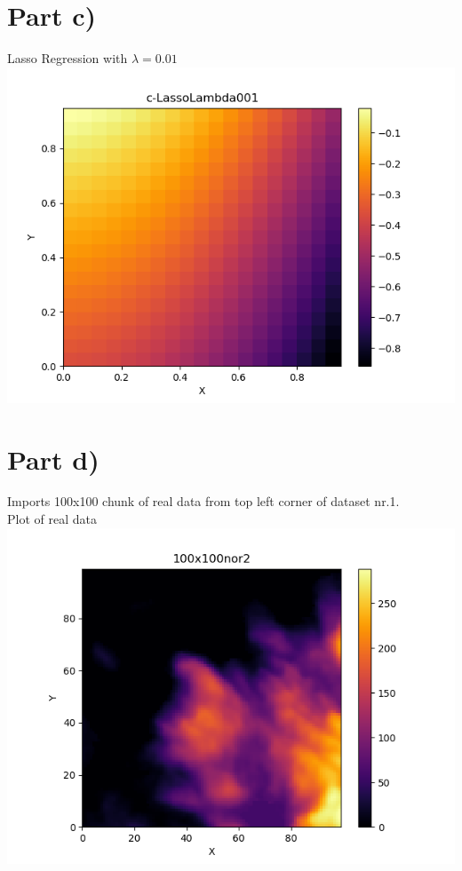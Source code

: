 \documentclass[a4paper,norsk]{article}
\begin{document}
\clearpage

\section*{Part c)}
Lasso Regression with $\lambda = 0.01$
\\ \includegraphics[scale=.7]{c-LassoLambda001}
\clearpage

\section*{Part d)}
Imports 100x100 chunk of real data from top left corner of dataset nr.1.
\\Plot of real data
\\ \includegraphics[scale=.7]{100x100nor2}
\clearpage
\end{document}
